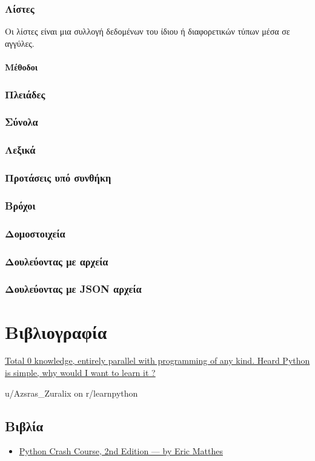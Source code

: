 \documentclass[12pt]{extreport}
\begin{document}
\subsection{Λίστες}
Οι λίστες είναι μια συλλογή δεδομένων του ίδιου ή διαφορετικών τύπων μέσα σε αγγύλες.

\subsubsection{Μέθοδοι}


\subsection{Πλειάδες}
\subsection{Σύνολα}
\subsection{Λεξικά}
\subsection{Προτάσεις υπό συνθήκη}
\subsection{Βρόχοι}
\subsection{Δομοστοιχεία}
\subsection{Δουλεύοντας με αρχεία}
\subsection{Δουλεύοντας με JSON αρχεία}

\chapter{Βιβλιογραφία}
\epigraph{\href{https://tinyurl.com/ycnad9ch}
    {Total 0 knowledge, entirely parallel with programming of any kind.
        Heard Python is simple, why would I want to learn it ?
    }
}{u/Azsras\_Zuralix on r/learnpython}
\newpage
\section{Βιβλία}
\begin{itemize}
    \item \href{https://tinyurl.com/y7l2a48c}{Python Crash Course, 2nd
              Edition — by Eric Matthes}
\end{itemize}
\end{document}
